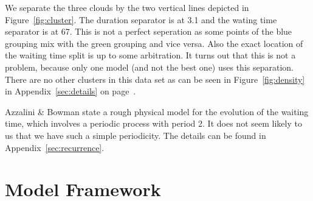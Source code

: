 \documentclass[english,final]{scrartcl}
\begin{document}
We separate the three clouds by the two vertical lines depicted in Figure~\ref{fig:cluster}. The duration separator is at 3.1 and the wating time separator is at 67. This is not a perfect seperation as some points of the blue grouping mix with the green grouping and vice versa. Also the exact location of the waiting time split is up to some arbitration. It turns out that this is not a problem, because only one model (and not the best one) uses this separation. There are no other clusters in this data set as can be seen in Figure~\ref{fig:density} in Appendix~\ref{sec:details} on page~\pageref{fig:density}.

Azzalini \& Bowman \cite{data} state a rough physical model for the evolution of the waiting time, which involves a periodic process with period 2. It does not seem likely to us that we have such a simple periodicity. The details can be found in Appendix~\ref{sec:recurrence}.










\section{Model Framework}
\end{document}
